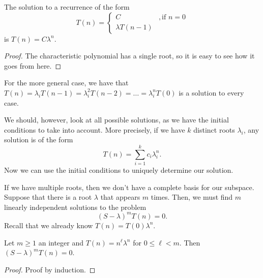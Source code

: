 \begin{lemma}
    The solution to a recurrence of the form \[
    T(n) = \begin{cases}
	C &, \text{if }n=0 \\
	\lambda T(n-1) &
    \end{cases}
    \] is $T(n) = C\lambda^{n}$.
\end{lemma}
\begin{proof}
    The characteristic polynomial has a single root, so it is easy to see how it goes from here.
\end{proof}

For the more general case, we have that $T(n) = \lambda_i T(n-1)=\lambda_i^{2} T(n-2) = \ldots = \lambda_i^{n}T(0)$ is a solution to every case.

We should, however, look at all possible solutions, as we have the initial conditions to take into account.
More precisely, if we have $k$ distinct roots $\lambda_i$, any solution is of the form \[
T(n) = \sum_{i=1}^{k} c_i \lambda_i^{n}
.\] 
Now we can use the initial conditions to uniquely determine our solution.

If we have multiple roots, then we don't have a complete basis for our subspace.
Suppose that there is a root $\lambda$ that appears $m$ times.
Then, we must find $m$ linearly independent solutions to the problem \[
    (S-\lambda)^{m}T(n) = 0
.\] 
Recall that we already know $T(n) = T(0)\lambda^{n}$.

\begin{lemma}
    Let $m\ge 1$ an integer and $T(n)=n^{\ell}\lambda^{n}$ for $0\le \ell < m$.
    Then $(S-\lambda)^{m}T(n) = 0$.
\end{lemma}
\begin{proof}
    Proof by induction.
\end{proof}


